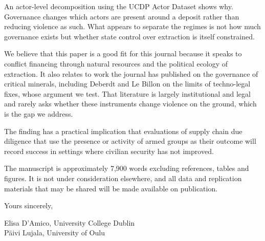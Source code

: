 \documentclass[11pt]{article}
\begin{document}
An actor-level decomposition using the UCDP Actor Dataset shows why. Governance
changes which actors are present around a deposit rather than reducing violence
as such. What appears to separate the regimes is not how much governance exists
but whether state control over extraction is itself constrained.

We believe that this paper is a good fit for this journal because it speaks to conflict
financing through natural resources and the political ecology of extraction. It
also relates to work the journal has published on the governance of critical
minerals, including Deberdt and Le Billon on the limits of techno-legal fixes,
whose argument we test. That literature is largely
institutional and legal and rarely asks whether these instruments change violence
on the ground, which is the gap we address.

The finding has a practical implication that evaluations of supply chain due
diligence that use the presence or activity of armed groups as their outcome will
record success in settings where civilian security has not improved. 

The manuscript is approximately 7,900 words excluding references, tables and
figures. It is not under consideration elsewhere, and all data and replication
materials that may be shared will be made available on publication.

\vspace{1em}
\noindent Yours sincerely,

\vspace{1em}
\noindent Elisa D'Amico, University College Dublin \\
Päivi Lujala, University of Oulu
\end{document}
